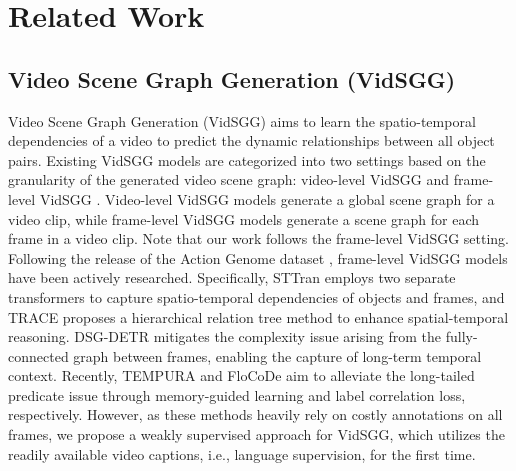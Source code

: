 \section{Related Work}
\label{sec:related_work}
\vspace{-1.5ex}
\subsection{Video Scene Graph Generation (VidSGG)} 
\vspace{-1ex}
Video Scene Graph Generation (VidSGG) aims to learn the spatio-temporal dependencies of a video to predict the dynamic relationships between all object pairs. Existing VidSGG models are categorized into two settings based on the granularity of the generated video scene graph: video-level VidSGG \citep{shang2017video,tsai2019video,shang2021video,wei2024defense} and frame-level VidSGG \citep{cong2021spatial,feng2023exploiting,teng2021target,li2022dynamic}. 
Video-level VidSGG models generate a global scene graph for a video clip, while frame-level VidSGG models generate a scene graph for each frame in a video clip. Note that our work follows the frame-level VidSGG setting.
Following the release of the Action Genome dataset \citep{ji2020action}, frame-level VidSGG models have been actively researched. Specifically, STTran \citep{cong2021spatial} employs two separate transformers to capture spatio-temporal dependencies of objects and frames, and TRACE \citep{teng2021target} proposes a hierarchical relation tree method to enhance spatial-temporal reasoning. DSG-DETR \citep{feng2023exploiting} mitigates the complexity issue arising from the fully-connected graph between frames, enabling the capture of long-term temporal context. {Recently, TEMPURA \citep{nag2023unbiased} and FloCoDe \citep{khandelwal2024flocode} aim to alleviate the long-tailed predicate issue through memory-guided learning and label correlation loss, respectively.} However, as these methods heavily rely on costly annotations on all frames, we propose a weakly supervised approach for VidSGG, which utilizes the readily available video captions, i.e., language supervision, for the first time.





